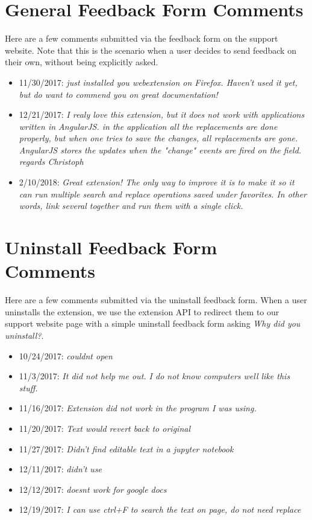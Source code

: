 \documentclass[bsc,frontabs,twoside,singlespacing,parskip,deptreport]{infthesis}
\begin{document}
\section{General Feedback Form Comments}
\label{section:general-feedback-form}
Here are a few comments submitted via the feedback form on the support website. Note that this is the scenario when a user decides to send feedback on their own, without being explicitly asked.
\begin{itemize}
\item
11/30/2017: \textit{just installed you webextension on Firefox. Haven't used it yet, but do want to commend you on great documentation!}
\item
12/21/2017: \textit{I realy love this extension, but it does not work with applications written in AngularJS. in the application all the replacements are done properly, but when one tries to save the changes, all replacements are gone. AngularJS stores the updates when the "change" events are fired on the field. regards Christoph}
\item
2/10/2018: \textit{Great extension!  The only way to improve it is to make it so it can run multiple search and replace operations saved under favorites. In other words, link several together and run them with a single click.}
\end{itemize}

\section{Uninstall Feedback Form Comments}
\label{section:uninstall-feedback-form}
Here are a few comments submitted via the uninstall feedback form. When a user uninstalls the extension, we use the extension API to redirect them to our support website page with a simple uninstall feedback form asking \textit{Why did you uninstall?}.
\begin{itemize}
\item
10/24/2017: \textit{couldnt open}
\item
11/3/2017: \textit{It did not help me out. I do not know computers well like this stuff.}
\item
11/16/2017: \textit{Extension did not work in the program I was using. }
\item
11/20/2017: \textit{Text would revert back to original}
\item
11/27/2017: \textit{Didn't find editable text in a jupyter notebook}
\item
12/11/2017: \textit{didn't use}
\item
12/12/2017: \textit{doesnt work for google docs}
\item
12/19/2017: \textit{I can use ctrl+F to search the text on page, do not need replace}
\end{itemize}
\end{document}
